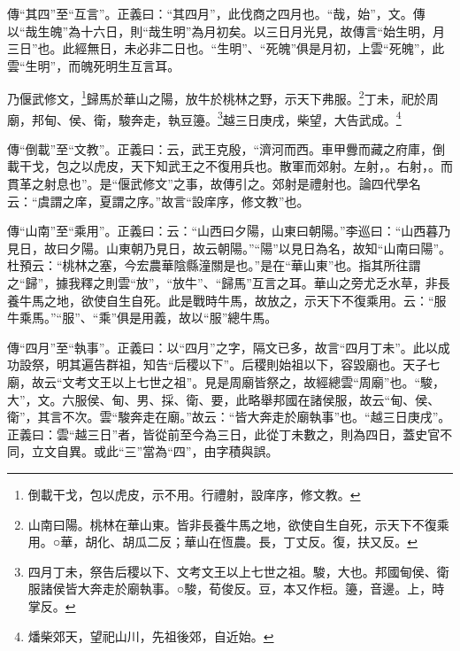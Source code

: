 {\noindent\zhuan{}\fzbyks 傳“其四”至“互言”。正義曰：“其四月”，此伐商之四月也。“哉，始”，文。傳以“哉生魄”為十六日，則“哉生明”為月初矣。以三日月光見，故傳言“始生明，月三日”也。此經無日，未必非二日也。“生明”、“死魄”俱是月初，上雲“死魄”，此雲“生明”，而魄死明生互言耳。 \par}

乃偃武修文，\footnote{倒載干戈，包以虎皮，示不用。行禮射，設庠序，修文教。}歸馬於華山之陽，放牛於桃林之野，示天下弗服。\footnote{山南曰陽。桃林在華山東。皆非長養牛馬之地，欲使自生自死，示天下不復乘用。○華，胡化、胡瓜二反；華山在恆農。長，丁丈反。復，扶又反。}丁未，祀於周廟，邦甸、侯、衛，駿奔走，執豆籩。\footnote{四月丁未，祭告后稷以下、文考文王以上七世之祖。駿，大也。邦國甸侯、衛服諸侯皆大奔走於廟執事。○駿，荀俊反。豆，本又作梪。籩，音邊。上，時掌反。}越三日庚戌，柴望，大告武成。\footnote{燔柴郊天，望祀山川，先祖後郊，自近始。}

{\noindent\zhuan{}\fzbyks 傳“倒載”至“文教”。正義曰：云，武王克殷，“濟河而西。車甲釁而藏之府庫，倒載干戈，包之以虎皮，天下知武王之不復用兵也。散軍而郊射。左射，。右射，。而貫革之射息也”。是“偃武修文”之事，故傳引之。郊射是禮射也。論四代學名云：“虞謂之庠，夏謂之序。”故言“設庠序，修文教”也。 \par}

{\noindent\zhuan{}\fzbyks 傳“山南”至“乘用”。正義曰：云：“山西曰夕陽，山東曰朝陽。”李巡曰：“山西暮乃見日，故曰夕陽。山東朝乃見日，故云朝陽。”“陽”以見日為名，故知“山南曰陽”。杜預云：“桃林之塞，今宏農華陰縣潼關是也。”是在“華山東”也。指其所往謂之“歸”，據我釋之則雲“放”，“放牛”、“歸馬”互言之耳。華山之旁尤乏水草，非長養牛馬之地，欲使自生自死。此是戰時牛馬，故放之，示天下不復乘用。云：“服牛乘馬。”“服”、“乘”俱是用義，故以“服”總牛馬。 \par}

{\noindent\zhuan{}\fzbyks 傳“四月”至“執事”。正義曰：以“四月”之字，隔文已多，故言“四月丁未”。此以成功設祭，明其遍告群祖，知告“后稷以下”。后稷則始祖以下，容毀廟也。天子七廟，故云“文考文王以上七世之祖”。見是周廟皆祭之，故經總雲“周廟”也。“駿，大”，文。六服侯、甸、男、採、衛、要，此略舉邦國在諸侯服，故云“甸、侯、衛”，其言不次。雲“駿奔走在廟。”故云：“皆大奔走於廟執事”也。“越三日庚戌”。正義曰：雲“越三日”者，皆從前至今為三日，此從丁未數之，則為四日，蓋史官不同，立文自異。或此“三”當為“四”，由字積與誤。 \par}

